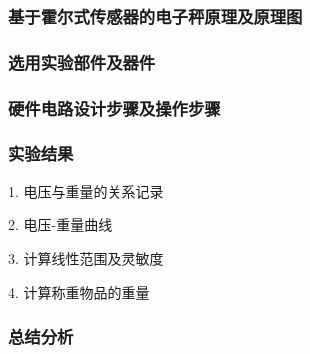 \subsubsection{基于霍尔式传感器的电子秤原理及原理图}

\subsubsection{选用实验部件及器件}

\subsubsection{硬件电路设计步骤及操作步骤}

\subsubsection{实验结果}

1. 电压与重量的关系记录

2. 电压-重量曲线

3. 计算线性范围及灵敏度

4. 计算称重物品的重量

\subsubsection{总结分析}

\newpage